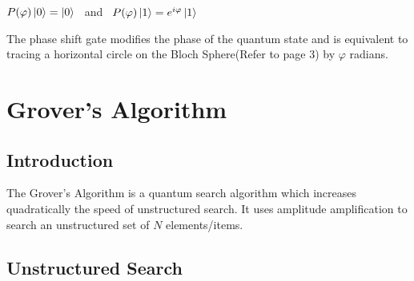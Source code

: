 \documentclass{article}
\begin{document}
\qquad $P(\varphi)\ket{0} = \ket{0}$ \ and \ $P(\varphi)\ket{1} = e^{i\varphi}\ket{1}$
\vspace{5mm}

\noindent
The phase shift gate modifies the phase of the quantum state and is equivalent to tracing a horizontal circle  on the Bloch Sphere(Refer to page 3) by $\varphi$ radians. 
\pagebreak






\section{Grover's Algorithm}
\subsection{Introduction}

The Grover's Algorithm is a quantum search algorithm which increases quadratically the speed of unstructured search. It uses  amplitude amplification to search an unstructured set of $N$ elements/items. 

\subsection{Unstructured Search}
\vspace{10mm}
\end{document}
